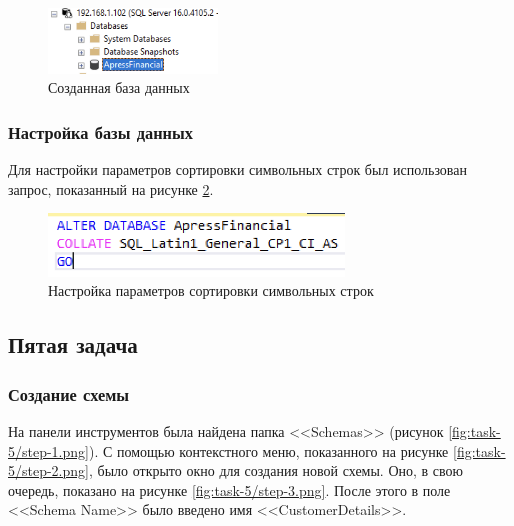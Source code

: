\documentclass[a4paper, 14pt]{extarticle}
\begin{document}
\begin{figure}[H]
  \centering
  \includegraphics[width=0.4\textwidth]{images/task-4/step-3.png}
  \caption{Созданная база данных}
  \label{fig:task-4/step-3.png}
\end{figure}

\subsubsection{Настройка базы данных}

Для настройки параметров сортировки символьных строк был использован запрос,
показанный на рисунке \ref{fig:task-4/step-4.png}.

\begin{figure}[H]
  \centering
  \includegraphics[width=0.7\textwidth]{images/task-4/step-4.png}
  \caption{Настройка параметров сортировки символьных строк}
  \label{fig:task-4/step-4.png}
\end{figure}

\subsection{Пятая задача}

\subsubsection{Создание схемы}

На панели инструментов была найдена папка <<Schemas>> (рисунок
\ref{fig:task-5/step-1.png}). С помощью контекстного меню, показанного на
рисунке \ref{fig:task-5/step-2.png}, было открыто окно для создания новой схемы.
Оно, в свою очередь, показано на рисунке \ref{fig:task-5/step-3.png}. После
этого в поле <<Schema Name>> было введено имя <<CustomerDetails>>.
\end{document}
